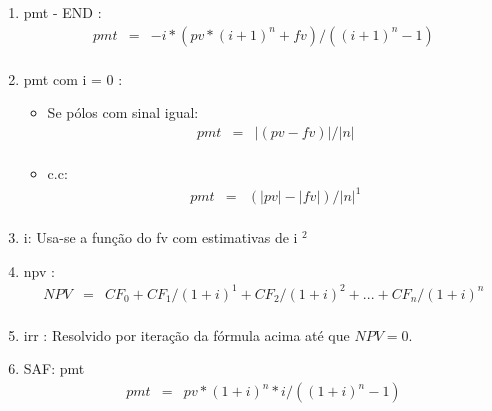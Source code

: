 \begin{enumerate}
\item  pmt - END \cite{arachnoid}:
\begin{eqnarray*}
	pmt &=& - i*( pv*(i+1)^{n} + fv ) / ((i+1)^{n} - 1) \\	
\end{eqnarray*}  
 

\item  pmt com i = 0 \cite{arachnoid2}:  

\begin{itemize}
 \item Se pólos com sinal igual:
	\begin{eqnarray*}
 		 pmt &=& |(pv - fv)| / |n| \\	
	\end{eqnarray*}
  \item c.c:
	\begin{eqnarray*}
 		pmt &=& (|pv| - |fv|) / |n|  ^{1} \\	 
	\end{eqnarray*}
\end{itemize}


\item  i: Usa-se a função do fv com estimativas de i $ ^{2} $  \cite{arachnoid2}


\item  npv \cite{man1}:
\begin{eqnarray*}
 	NPV &=& CF_{0} + CF_{1} / (1+i)^{1} + CF_{2} / (1+i)^{2} + ... + CF_{n} / (1+i)^{n} \\
\end{eqnarray*}
 

\item  irr \cite {matFinanceira2}: Resolvido por iteração da fórmula acima até que $ NPV = 0. $ 


\item SAF: pmt \cite{adail}
\begin{eqnarray*}
 	pmt &=& pv * (1+i)^{n} * i / ((1+i)^{n}-1) \\
\end{eqnarray*}
 

\end{enumerate}
